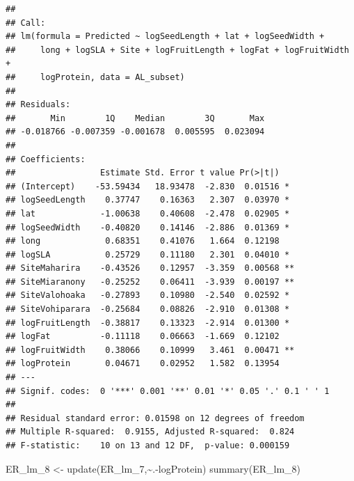 \documentclass[
  12pt,
]{article}
\newenvironment{Shaded}{\begin{snugshade}}{\end{snugshade}}
\newcommand{\FunctionTok}[1]{\textcolor[rgb]{0.00,0.00,0.00}{#1}}
\newcommand{\NormalTok}[1]{#1}
\newcommand{\OtherTok}[1]{\textcolor[rgb]{0.56,0.35,0.01}{#1}}
\newcommand{\SpecialCharTok}[1]{\textcolor[rgb]{0.00,0.00,0.00}{#1}}
\begin{document}
\begin{verbatim}
## 
## Call:
## lm(formula = Predicted ~ logSeedLength + lat + logSeedWidth + 
##     long + logSLA + Site + logFruitLength + logFat + logFruitWidth + 
##     logProtein, data = AL_subset)
## 
## Residuals:
##       Min        1Q    Median        3Q       Max 
## -0.018766 -0.007359 -0.001678  0.005595  0.023094 
## 
## Coefficients:
##                 Estimate Std. Error t value Pr(>|t|)   
## (Intercept)    -53.59434   18.93478  -2.830  0.01516 * 
## logSeedLength    0.37747    0.16363   2.307  0.03970 * 
## lat             -1.00638    0.40608  -2.478  0.02905 * 
## logSeedWidth    -0.40820    0.14146  -2.886  0.01369 * 
## long             0.68351    0.41076   1.664  0.12198   
## logSLA           0.25729    0.11180   2.301  0.04010 * 
## SiteMaharira    -0.43526    0.12957  -3.359  0.00568 **
## SiteMiaranony   -0.25252    0.06411  -3.939  0.00197 **
## SiteValohoaka   -0.27893    0.10980  -2.540  0.02592 * 
## SiteVohiparara  -0.25684    0.08826  -2.910  0.01308 * 
## logFruitLength  -0.38817    0.13323  -2.914  0.01300 * 
## logFat          -0.11118    0.06663  -1.669  0.12102   
## logFruitWidth    0.38066    0.10999   3.461  0.00471 **
## logProtein       0.04671    0.02952   1.582  0.13954   
## ---
## Signif. codes:  0 '***' 0.001 '**' 0.01 '*' 0.05 '.' 0.1 ' ' 1
## 
## Residual standard error: 0.01598 on 12 degrees of freedom
## Multiple R-squared:  0.9155, Adjusted R-squared:  0.824 
## F-statistic:    10 on 13 and 12 DF,  p-value: 0.000159
\end{verbatim}

\begin{Shaded}
\begin{Highlighting}[]
\NormalTok{ER\_lm\_8 }\OtherTok{\textless{}{-}} \FunctionTok{update}\NormalTok{(ER\_lm\_7,}\SpecialCharTok{\textasciitilde{}}\NormalTok{.}\SpecialCharTok{{-}}\NormalTok{logProtein)}
\FunctionTok{summary}\NormalTok{(ER\_lm\_8)}
\end{Highlighting}
\end{Shaded}
\end{document}
